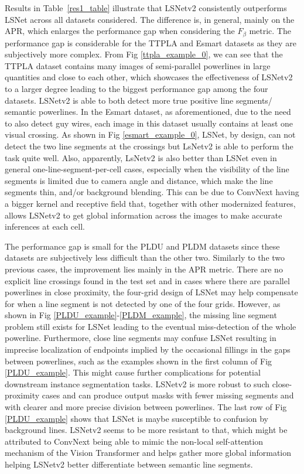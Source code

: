 \documentclass[journal]{IEEEtran}
\begin{document}
 Results in Table~\ref{res1_table} illustrate that LSNetv2 consistently outperforms LSNet across all datasets considered. The difference is, in general, mainly on the APR, which enlarges the performance gap when considering the $F_{\beta}$ metric. The performance gap is considerable for the TTPLA and Esmart datasets as they are subjectively more complex.  From Fig \ref{ttpla_example_0}, we can see that the TTPLA dataset contains many images of semi-parallel powerlines in large quantities and close to each other, which showcases the effectiveness of LSNetv2 to a larger degree leading to the biggest performance gap among the four datasets. LSNetv2 is able to both detect more true positive line segments/ semantic powerlines. In the Esmart dataset, as aforementioned, due to the need to also detect guy wires, each image in this dataset usually contains at least one visual crossing. As shown in Fig \ref{esmart_example_0}, LSNet, by design, can not detect the two line segments at the crossings but LsNetv2 is able to perform the task quite well. Also, apparently, LsNetv2 is also better than LSNet even in general one-line-segment-per-cell cases, especially when the visibility of the line segments is limited due to camera angle and distance, which make the line segments thin, and/or background blending. This can be due to ConvNext having a bigger kernel and receptive field that, together with other modernized features, allows LSNetv2 to get global information across the images to make accurate inferences at each cell.
 
 The performance gap is small for the PLDU and PLDM datasets since these datasets are subjectively less difficult than the other two. Similarly to the two previous cases, the improvement lies mainly in the APR metric. There are no explicit line crossings found in the test set and in cases where there are parallel powerlines in close proximity, the four-grid design of LSNet may help compensate for when a line segment is not detected by one of the four grids. However, as shown in Fig \ref{PLDU_example}-\ref{PLDM_example}, the missing line segment problem still exists for LSNet leading to the eventual miss-detection of the whole powerline. Furthermore, close line segments may confuse LSNet resulting in imprecise localization of endpoints implied by the occasional fillings in the gaps between powerlines, such as the examples shown in the first column of Fig \ref{PLDU_example}. This might cause further complications for potential downstream instance segmentation tasks. LSNetv2 is more robust to such close-proximity cases and can produce output masks with fewer missing segments and with clearer and more precise division between powerlines. The last row of Fig \ref{PLDU_example} shows that LSNet is maybe susceptible to confusion by background lines. LSNetv2 seems to be more resistant to that, which might be attributed to ConvNext being able to mimic the non-local self-attention mechanism of the Vision Transformer \cite{vit} and helps gather more global information helping LSNetv2 better differentiate between semantic line segments.
\end{document}
